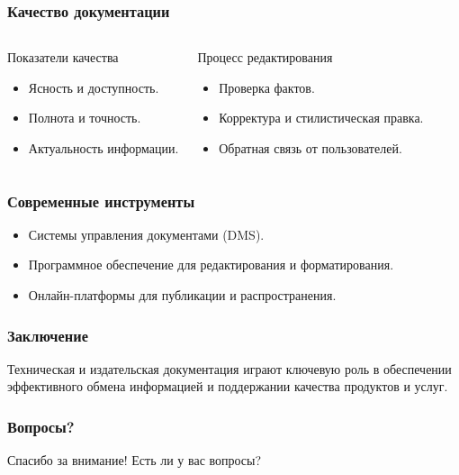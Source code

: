 \documentclass{beamer}
\begin{document}
\begin{frame}
\frametitle{Качество документации}
\begin{columns}
\begin{block}{Показатели качества}
\begin{itemize}
    \item Ясность и доступность.
    \item Полнота и точность.
    \item Актуальность информации.
\end{itemize}
\end{block}
\begin{block}{Процесс редактирования}
\begin{itemize}
    \item Проверка фактов.
    \item Корректура и стилистическая правка.
    \item Обратная связь от пользователей.
\end{itemize}
\end{block}
\end{columns}
\end{frame}

\begin{frame}
\frametitle{Современные инструменты}
\begin{itemize}
    \item Системы управления документами (DMS).
    \item Программное обеспечение для редактирования и форматирования.
    \item Онлайн-платформы для публикации и распространения.
\end{itemize}
\end{frame}

\begin{frame}
\frametitle{Заключение}
Техническая и издательская документация играют ключевую роль в обеспечении эффективного обмена информацией и поддержании качества продуктов и услуг.
\end{frame}

\begin{frame}
\frametitle{Вопросы?}
Спасибо за внимание! Есть ли у вас вопросы?
\end{frame}
\end{document}
